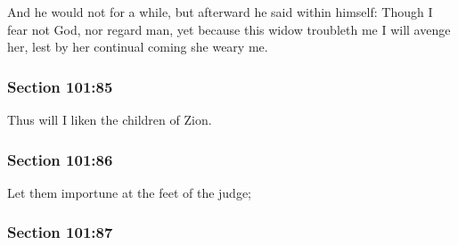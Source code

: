 		And he would not for a while, but afterward he said within himself: Though I fear not God, nor regard man, yet because this widow troubleth me I will avenge her, lest by her continual coming she weary me.


	\subsubsection{Section 101:85} %
		\label{DC101-85}

		Thus will I liken the children of Zion.


	\subsubsection{Section 101:86} %
		\label{DC101-86}

		Let them importune at the feet of the judge;


	\subsubsection{Section 101:87} %
		\label{DC101-87}

